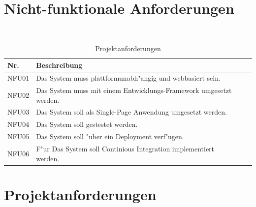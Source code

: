 \documentclass[a4paper, 11pt]{scrreprt}
\begin{document}
\section{Nicht-funktionale Anforderungen}

\begin{table}[H]

\caption{Projektanforderungen}

\ \\

\par

\label{tab:Tabelle1}

\centering

\begin{tabular}{|p{2.5cm} p{12cm}| ll}

\hline
Nr.	& Beschreibung\\

\hline
NFU01 &	Das System muss plattformunabh"angig und webbasiert sein. \\

\hline
NFU02 &	Das System muss mit einem Entwicklungs-Framework umgesetzt werden.\\

\hline
NFU03 &	Das System soll als Single-Page Anwendung umgesetzt werden.\\

\hline
NFU04 &	Das System soll gestestet werden.\\

\hline
NFU05 &	Das System soll "uber ein Deployment verf"ugen.\\

\hline
NFU06 &	F"ur Das System soll Continious Integration implementiert werden.\\

\end{tabular}

\end{table}

\section{Projektanforderungen}
\end{document}
